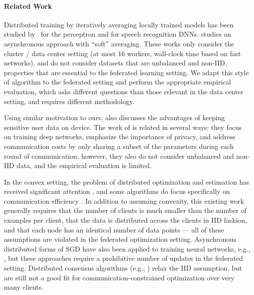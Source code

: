 \documentclass[twoside]{article}
\begin{document}
\paragraph{Related Work} 
Distributed training by iteratively averaging locally trained models
has been studied
by~\citet{mcdonald10distributed} for the perceptron and
\citet{povey15parallel} for speech recognition DNNs.
\citet{zhang15elastic} studies an asynchronous approach with ``soft''
averaging.  These works only consider the cluster / data center setting
(at most 16 workers, wall-clock time based on fast networks), and do
not consider datasets that are unbalanced and non-IID, properties that
are essential to the federated learning setting.
We adapt this style of algorithm to the federated setting and perform
the appropriate empirical evaluation, which asks different questions
than those relevant in the data center setting, and requires different
methodology.

Using similar motivation to ours, \citet{neverova16motion} also
discusses the advantages of keeping sensitive user data on device. The
work of \citet{shokri15privacy} is related in several ways: they focus
on training deep networks, emphasize the importance of privacy, and
address communication costs by only sharing a subset of the parameters
during each round of communication; however, they also do not consider
unbalanced and non-IID data, and the empirical evaluation is limited.

In the convex setting, the problem of distributed optimization and
estimation has received significant attention
\citep{balcan12distributed, fercoq14fast, shamir14distributed}, and
some algorithms do focus specifically on communication efficiency
\citep{zhang13information,shamir13dane,tianbao13trading,
  chenxin15cocoa, zhang15disco}. In addition to assuming convexity,
this existing work generally requires that the number of clients is
much smaller than the number of examples per client, that the data is
distributed across the clients in IID fashion, and that each node has
an identical number of data points --- all of these assumptions are
violated in the federated optimization setting.  Asynchronous
distributed forms of SGD have also been applied to training neural
networks, e.g., \citet{dean12large}, but these approaches require a
prohibitive number of updates in the federated setting. 
Distributed consensus algorithms (e.g., \citep{zhang14admm}) relax the
IID assumption, but are still not a good fit for
communication-constrained optimization over very many clients.
\end{document}
